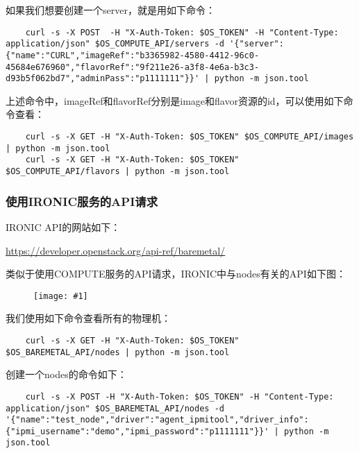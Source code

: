 \documentclass[a4paper,left=1.5cm,right=1.5cm,11pt]{article}
\newcommand{\fic}[1]{\begin{figure}[H]
		\center
		\texttt{[image: \#1]}
	\end{figure}}
\begin{document}
	如果我们想要创建一个server，就是用如下命令：
	\begin{lstlisting}
	curl -s -X POST  -H "X-Auth-Token: $OS_TOKEN" -H "Content-Type: application/json" $OS_COMPUTE_API/servers -d '{"server":{"name":"CURL","imageRef":"b3365982-4580-4412-96c0-45684e676960","flavorRef":"9f211e26-a3f8-4e6a-b3c3-d93b5f062bd7","adminPass":"p1111111"}}' | python -m json.tool
	\end{lstlisting}

	上述命令中，imageRef和flavorRef分别是image和flavor资源的id，可以使用如下命令查看：
	\begin{lstlisting}
	curl -s -X GET -H "X-Auth-Token: $OS_TOKEN" $OS_COMPUTE_API/images | python -m json.tool
	curl -s -X GET -H "X-Auth-Token: $OS_TOKEN" $OS_COMPUTE_API/flavors | python -m json.tool
	\end{lstlisting}

\subsubsection{使用IRONIC服务的API请求}
	IRONIC API的网站如下：\par
	\url{https://developer.openstack.org/api-ref/baremetal/}

	类似于使用COMPUTE服务的API请求，IRONIC中与nodes有关的API如下图：
	\fic{2.png}

	我们使用如下命令查看所有的物理机：
	\begin{lstlisting}
	curl -s -X GET -H "X-Auth-Token: $OS_TOKEN" $OS_BAREMETAL_API/nodes | python -m json.tool
	\end{lstlisting}

	创建一个nodes的命令如下：
	\begin{lstlisting}
	curl -s -X POST -H "X-Auth-Token: $OS_TOKEN" -H "Content-Type: application/json" $OS_BAREMETAL_API/nodes -d '{"name":"test_node","driver":"agent_ipmitool","driver_info":{"ipmi_username":"demo","ipmi_password":"p1111111"}}' | python -m json.tool
	\end{lstlisting}
\end{document}
